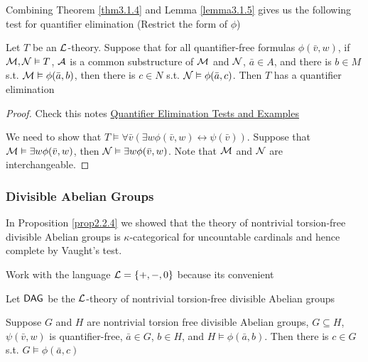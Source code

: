\documentclass[11pt]{article}
\begin{document}
Combining Theorem \ref{thm3.1.4} and Lemma \ref{lemma3.1.5} gives us the
following test for quantifier elimination (Restrict the form of \(\phi\))
\begin{corollary}[]
\label{cor3.1.6}
\label{Problem3}
Let \(T\) be an \(\mathcal{L}\)-theory. Suppose that for all quantifier-free
formulas \(\phi(\bar{v},w)\), if \(\mathcal{M},\mathcal{N}\vDash T\), \(\mathcal{A}\) is a common
substructure of \(\mathcal{M}\) and \(\mathcal{N}\), \(\bar{a}\in A\), and there is
\(b\in M\) s.t. \(\mathcal{M}\vDash\phi(\bar{a},b)\), then there is \(c\in N\) s.t.
\(\mathcal{N}\vDash\phi(\bar{a},c)\). Then \(T\) has a quantifier elimination
\end{corollary}

\begin{proof}
Check this notes \href{http://www.math.uni-konstanz.de/\~eleftheriou/teaching/Masterarbeit.pdf}{Quantifier Elimination Tests and Examples}

We need to show that \(T\vDash\forall\bar{v}(\exists w\phi(\bar{v},w)\leftrightarrow\psi(\bar{v}))\).
Suppose that \(\mathcal{M}\vDash\exists w\phi(\bar{v},w)\), then
\(\mathcal{N}\vDash\exists w\phi(\bar{v},w)\). Note that \(\mathcal{M}\) and \(\mathcal{N}\) are interchangeable.
\end{proof}

\subsubsection{Divisible Abelian Groups}
\label{sec:org01fdb90}
In Proposition \ref{prop2.2.4} we showed that the theory of nontrivial torsion-free divisible
Abelian groups is \(\kappa\)-categorical for uncountable cardinals and hence complete by Vaught's test.

Work with the language \(\mathcal{L}=\{+,-,0\}\) because its convenient

Let \(\operatorname{\textsf{DAG}}\) be the \(\mathcal{L}\)-theory of nontrivial torsion-free divisible Abelian
groups

\begin{lemma}[]
\label{lemma3.1.7}
Suppose \(G\) and \(H\) are nontrivial torsion free divisible Abelian
groups, \(G\subseteq H\), \(\psi(\bar{v},w)\) is quantifier-free,
\(\bar{a}\in G\), \(b\in H\), and \(H\vDash\phi(\bar{a},b)\). Then there is
\(c\in G\) s.t. \(G\vDash\phi(\bar{a},c)\)
\end{lemma}
\end{document}
